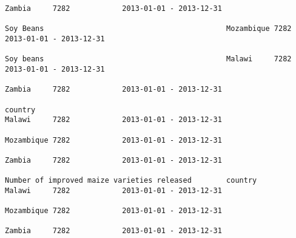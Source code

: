 \documentclass[11pt]{article}
\begin{document}
\begin{Verbatim}[commandchars=\\\{\}]
                                                                                                                                                                                                                 Zambia     7282            2013-01-01 - 2013-12-31   
                                                                                                                                                              Soy Beans                                          Mozambique 7282            2013-01-01 - 2013-12-31   
                                                                                                                                                              Soy beans                                          Malawi     7282            2013-01-01 - 2013-12-31   
                                                                                                                                                                                                                 Zambia     7282            2013-01-01 - 2013-12-31   
                                                                                                                            country                                                                              Malawi     7282            2013-01-01 - 2013-12-31   
                                                                                                                                                                                                                 Mozambique 7282            2013-01-01 - 2013-12-31   
                                                                                                                                                                                                                 Zambia     7282            2013-01-01 - 2013-12-31   
                                                                         Number of improved maize varieties released        country                                                                              Malawi     7282            2013-01-01 - 2013-12-31   
                                                                                                                                                                                                                 Mozambique 7282            2013-01-01 - 2013-12-31   
                                                                                                                                                                                                                 Zambia     7282            2013-01-01 - 2013-12-31   

\end{Verbatim}
\end{document}
